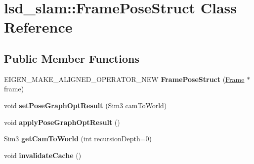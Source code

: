 \hypertarget{classlsd__slam_1_1_frame_pose_struct}{\section{lsd\-\_\-slam\-:\-:Frame\-Pose\-Struct Class Reference}
\label{classlsd__slam_1_1_frame_pose_struct}
}
\subsection*{Public Member Functions}
\begin{DoxyCompactItemize}
\item 
\hypertarget{classlsd__slam_1_1_frame_pose_struct_aeeb515a2e0fb2483ad7c098ad70357d9}{E\-I\-G\-E\-N\-\_\-\-M\-A\-K\-E\-\_\-\-A\-L\-I\-G\-N\-E\-D\-\_\-\-O\-P\-E\-R\-A\-T\-O\-R\-\_\-\-N\-E\-W {\bfseries Frame\-Pose\-Struct} (\hyperlink{classlsd__slam_1_1_frame}{Frame} $\ast$frame)}\label{classlsd__slam_1_1_frame_pose_struct_aeeb515a2e0fb2483ad7c098ad70357d9}

\item 
\hypertarget{classlsd__slam_1_1_frame_pose_struct_a3d5c5bd4bf131a4ccbda54b9554d18f9}{void {\bfseries set\-Pose\-Graph\-Opt\-Result} (Sim3 cam\-To\-World)}\label{classlsd__slam_1_1_frame_pose_struct_a3d5c5bd4bf131a4ccbda54b9554d18f9}

\item 
\hypertarget{classlsd__slam_1_1_frame_pose_struct_a6a5df905cf934f3a20f4ff2a21060aab}{void {\bfseries apply\-Pose\-Graph\-Opt\-Result} ()}\label{classlsd__slam_1_1_frame_pose_struct_a6a5df905cf934f3a20f4ff2a21060aab}

\item 
\hypertarget{classlsd__slam_1_1_frame_pose_struct_ae2e711db13b9732374fd5e04f960f914}{Sim3 {\bfseries get\-Cam\-To\-World} (int recursion\-Depth=0)}\label{classlsd__slam_1_1_frame_pose_struct_ae2e711db13b9732374fd5e04f960f914}

\item 
\hypertarget{classlsd__slam_1_1_frame_pose_struct_ab9486b6fbedeb81e5e7d29f02f92c008}{void {\bfseries invalidate\-Cache} ()}\label{classlsd__slam_1_1_frame_pose_struct_ab9486b6fbedeb81e5e7d29f02f92c008}

\end{DoxyCompactItemize}

